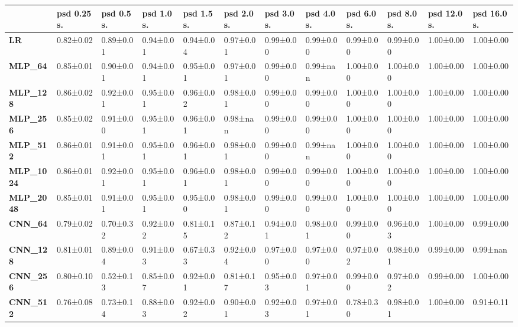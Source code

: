 \begin{tabular}{llllllllllll}
\toprule
{} & psd 0.25 s. & psd 0.5 s. & psd 1.0 s. & psd 1.5 s. & psd 2.0 s. & psd 3.0 s. & psd 4.0 s. & psd 6.0 s. & psd 8.0 s. & psd 12.0 s. & psd 16.0 s. \\
\midrule
\textbf{LR            } &   0.82±0.02 &  0.89±0.01 &  0.94±0.01 &  0.94±0.04 &  0.97±0.01 &  0.99±0.00 &  0.99±0.00 &  0.99±0.00 &  0.99±0.00 &   1.00±0.00 &   1.00±0.00 \\
\textbf{MLP\_64        } &   0.85±0.01 &  0.90±0.01 &  0.94±0.01 &  0.95±0.01 &  0.97±0.01 &  0.99±0.00 &   0.99±nan &  1.00±0.00 &  1.00±0.00 &   1.00±0.00 &   1.00±0.00 \\
\textbf{MLP\_128       } &   0.86±0.02 &  0.92±0.01 &  0.95±0.01 &  0.96±0.02 &  0.98±0.01 &  0.99±0.00 &  0.99±0.00 &  1.00±0.00 &  1.00±0.00 &   1.00±0.00 &   1.00±0.00 \\
\textbf{MLP\_256       } &   0.85±0.02 &  0.91±0.00 &  0.95±0.01 &  0.96±0.01 &   0.98±nan &  0.99±0.00 &  0.99±0.00 &  1.00±0.00 &  1.00±0.00 &   1.00±0.00 &   1.00±0.00 \\
\textbf{MLP\_512       } &   0.86±0.01 &  0.91±0.01 &  0.95±0.01 &  0.96±0.01 &  0.98±0.01 &  0.99±0.00 &   0.99±nan &  1.00±0.00 &  1.00±0.00 &   1.00±0.00 &   1.00±0.00 \\
\textbf{MLP\_1024      } &   0.86±0.01 &  0.92±0.01 &  0.95±0.01 &  0.96±0.01 &  0.98±0.01 &  0.99±0.00 &  0.99±0.00 &  1.00±0.00 &  1.00±0.00 &   1.00±0.00 &   1.00±0.00 \\
\textbf{MLP\_2048      } &   0.85±0.01 &  0.91±0.01 &  0.95±0.01 &  0.95±0.00 &  0.98±0.01 &  0.99±0.00 &  0.99±0.00 &  1.00±0.00 &  1.00±0.00 &   1.00±0.00 &   1.00±0.00 \\
\textbf{CNN\_64        } &   0.79±0.02 &  0.70±0.32 &  0.92±0.02 &  0.81±0.15 &  0.87±0.12 &  0.94±0.01 &  0.98±0.01 &  0.99±0.00 &  0.96±0.03 &   1.00±0.00 &   0.99±0.00 \\
\textbf{CNN\_128       } &   0.81±0.01 &  0.89±0.04 &  0.91±0.03 &  0.67±0.33 &  0.92±0.04 &  0.97±0.00 &  0.97±0.00 &  0.97±0.02 &  0.98±0.01 &   0.99±0.00 &    0.99±nan \\
\textbf{CNN\_256       } &   0.80±0.10 &  0.52±0.13 &  0.85±0.07 &  0.92±0.01 &  0.81±0.17 &  0.95±0.03 &  0.97±0.01 &  0.99±0.00 &  0.97±0.02 &   0.99±0.00 &   1.00±0.00 \\
\textbf{CNN\_512       } &   0.76±0.08 &  0.73±0.14 &  0.88±0.03 &  0.92±0.02 &  0.90±0.01 &  0.92±0.03 &  0.97±0.01 &  0.78±0.30 &  0.98±0.01 &   1.00±0.00 &   0.91±0.11 \\

\end{tabular}
